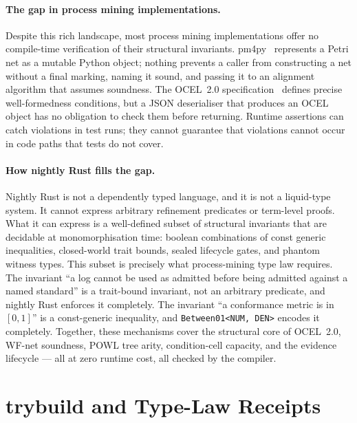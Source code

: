 \paragraph{The gap in process mining implementations.}
Despite this rich landscape, most process mining implementations offer no
compile-time verification of their structural invariants.
pm4py~\cite{berti2019pm4py} represents a Petri net as a mutable Python object;
nothing prevents a caller from constructing a net without a final marking,
naming it sound, and passing it to an alignment algorithm that assumes
soundness. The OCEL~2.0 specification~\cite{ocel20_2023} defines precise
well-formedness conditions, but a JSON deserialiser that produces an OCEL
object has no obligation to check them before returning. Runtime assertions
can catch violations in test runs; they cannot guarantee that violations
cannot occur in code paths that tests do not cover.

\paragraph{How nightly Rust fills the gap.}
Nightly Rust is not a dependently typed language, and it is not a liquid-type
system. It cannot express arbitrary refinement predicates or term-level proofs.
What it can express is a well-defined subset of structural invariants that are
decidable at monomorphisation time: boolean combinations of const generic
inequalities, closed-world trait bounds, sealed lifecycle gates, and phantom
witness types. This subset is precisely what process-mining type law requires.
The invariant ``a log cannot be used as admitted before being admitted against
a named standard'' is a trait-bound invariant, not an arbitrary predicate, and
nightly Rust enforces it completely. The invariant ``a conformance metric is in
$[0,1]$'' is a const-generic inequality, and \texttt{Between01<NUM, DEN>}
encodes it completely. Together, these mechanisms cover the structural core of
OCEL~2.0, WF-net soundness, POWL tree arity, condition-cell capacity, and the
evidence lifecycle --- all at zero runtime cost, all checked by the compiler.

\section{trybuild and Type-Law Receipts}
\label{sec:bg-trybuild}

